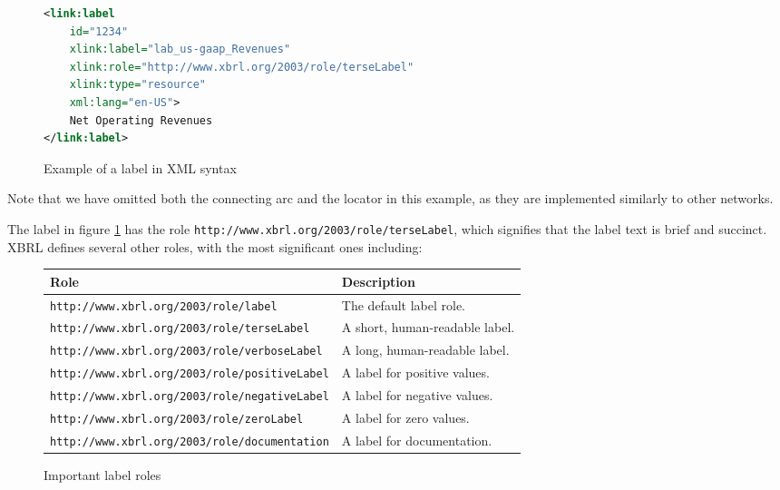 \begin{figure}[H]
    \begin{lstlisting}[language=XML, basicstyle=\ttfamily\small]
<link:label 
    id="1234" 
    xlink:label="lab_us-gaap_Revenues" 
    xlink:role="http://www.xbrl.org/2003/role/terseLabel" 
    xlink:type="resource" 
    xml:lang="en-US">
    Net Operating Revenues
</link:label>
\end{lstlisting}
    \caption{Example of a label in XML syntax}
    \label{fig:example_label_xml}
\end{figure}

Note that we have omitted both the connecting arc and the locator in this example, 
as they are implemented similarly to other networks.

The label in figure \ref{fig:example_label_xml} has the role \texttt{http://www.xbrl.org/2003/role/terseLabel},
which signifies that the label text is brief and succinct.
XBRL defines several other roles, with the most significant ones including:

\begin{figure}[H]
    \begin{tabular}{|l|l|}
        \hline
        \textbf{Role} & \textbf{Description} \\ \hline
        \texttt{http://www.xbrl.org/2003/role/label} & The default label role. \\ \hline
        \texttt{http://www.xbrl.org/2003/role/terseLabel} & A short, human-readable label. \\ \hline
        \texttt{http://www.xbrl.org/2003/role/verboseLabel} & A long, human-readable label. \\ \hline
        \texttt{http://www.xbrl.org/2003/role/positiveLabel} & A label for positive values. \\ \hline
        \texttt{http://www.xbrl.org/2003/role/negativeLabel} & A label for negative values. \\ \hline
        \texttt{http://www.xbrl.org/2003/role/zeroLabel} & A label for zero values. \\ \hline
        \texttt{http://www.xbrl.org/2003/role/documentation} & A label for documentation. \\ \hline
    \end{tabular}
    \caption{Important label roles}
    \label{fig:important_label_roles}
\end{figure}

